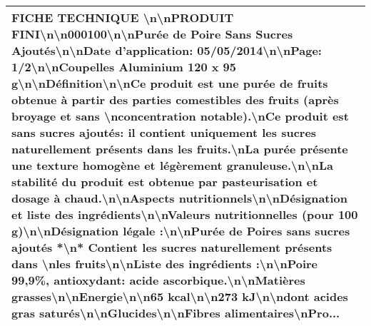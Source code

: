 \begin{tabular}{p{\linewidth}}
 FICHE TECHNIQUE \textbackslash n\textbackslash nPRODUIT FINI\textbackslash n\textbackslash n000100\textbackslash n\textbackslash nPurée de Poire Sans Sucres Ajoutés\textbackslash n\textbackslash nDate d'application: 05/05/2014\textbackslash n\textbackslash nPage: 1/2\textbackslash n\textbackslash nCoupelles Aluminium 120 x 95 g\textbackslash n\textbackslash nDéfinition\textbackslash n\textbackslash nCe produit est une purée de fruits obtenue à partir des parties comestibles des fruits (après broyage et sans \textbackslash nconcentration notable).\textbackslash nCe produit est sans sucres ajoutés: il contient uniquement les sucres naturellement présents dans les fruits.\textbackslash nLa purée présente une texture homogène et légèrement granuleuse.\textbackslash n\textbackslash nLa stabilité du produit est obtenue par pasteurisation et dosage à chaud.\textbackslash n\textbackslash nAspects nutritionnels\textbackslash n\textbackslash nDésignation et liste des ingrédients\textbackslash n\textbackslash nValeurs nutritionnelles (pour 100 g)\textbackslash n\textbackslash nDésignation légale :\textbackslash n\textbackslash nPurée de Poires sans sucres ajoutés *\textbackslash n* Contient les sucres naturellement présents dans \textbackslash nles fruits\textbackslash n\textbackslash nListe des ingrédients :\textbackslash n\textbackslash nPoire 99,9\%, antioxydant: acide ascorbique.\textbackslash n\textbackslash nMatières grasses\textbackslash n\textbackslash nEnergie\textbackslash n\textbackslash n65 kcal\textbackslash n\textbackslash n273 kJ\textbackslash n\textbackslash ndont acides gras saturés\textbackslash n\textbackslash nGlucides\textbackslash n\textbackslash nFibres alimentaires\textbackslash nPro... \\
\bottomrule
\end{tabular}
